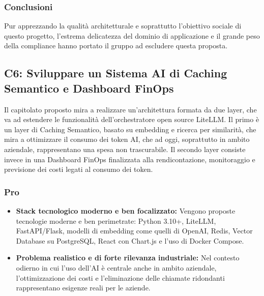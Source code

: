 \subsubsection{Conclusioni}
Pur apprezzando la qualità architetturale e soprattutto l'obiettivo sociale di questo progetto, l'estrema delicatezza del dominio di applicazione e il grande peso della compliance hanno portato il gruppo ad escludere questa proposta.

\subsection{C6: Sviluppare un Sistema AI di Caching Semantico e Dashboard FinOps}

Il capitolato proposto mira a realizzare un'architettura formata da due layer, che va ad estendere le funzionalità dell'orchestratore open source LiteLLM. Il primo  è un layer di Caching Semantico, basato su embedding e ricerca per similarità, che mira a ottimizzare il consumo dei token AI, che ad oggi, soprattutto in ambito aziendale, rappresentano una spesa non trascurabile. Il secondo layer consiste invece in una Dashboard FinOps finalizzata alla  rendicontazione, monitoraggio e previsione dei costi legati al consumo dei token.

\subsubsection{Pro}
\begin{itemize}
    \item \textbf{Stack tecnologico moderno e ben focalizzato:} Vengono proposte tecnologie moderne e ben perimetrate: Python 3.10+, LiteLLM, FastAPI/Flask, modelli di embedding come quelli di OpenAI, Redis, Vector Database su PostgreSQL, React con Chart.js e l'uso di Docker Compose.
    \item \textbf{Problema realistico e di forte rilevanza industriale:} Nel contesto odierno in cui l'uso dell'AI è centrale anche in ambito aziendale, l'ottimizzazione dei costi e l'eliminazione delle chiamate ridondanti rappresentano esigenze reali per le aziende.
\end{itemize}

